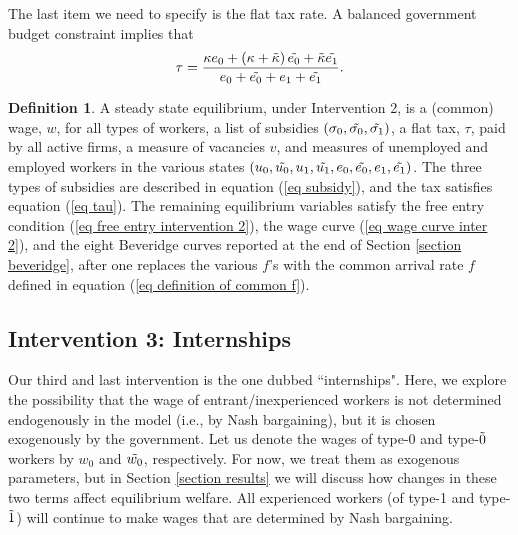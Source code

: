 \documentclass[12pt]{article} %
\theoremstyle{definition}
\newtheorem{definition}{Definition}%
\begin{document}
The last item we need to specify is the flat tax rate. 
A balanced government budget constraint implies that 
\begin{equation}
    \tau = \frac{\kappa e_0 + (\kappa + \Tilde{\kappa})\, \Tilde{e_0} + \Tilde{\kappa}\Tilde{e_1}}{e_0+ \Tilde{e_0}+e_1+\tilde{e_1}}. \label{eq tau}
\end{equation}


\begin{definition}\label{definition equil inter 2}
    A steady state equilibrium, under Intervention 2, is a (common) wage, $w$, for all types of workers, a list of subsidies $(\sigma_0, \Tilde{\sigma_0}, \Tilde{\sigma_1})$, a flat tax, $\tau$, paid by all active firms, a measure of vacancies $v$, and measures of unemployed and employed workers in the various states $(u_0, \Tilde{u_0}, u_1, \Tilde{u_1}, e_0, \Tilde{e_0}, e_1, \Tilde{e_1})$. The three types of subsidies are described in equation (\ref{eq subsidy}), and the tax satisfies equation (\ref{eq tau}). The remaining equilibrium variables satisfy the free entry condition (\ref{eq free entry intervention 2}), the wage curve (\ref{eq wage curve inter 2}), and the eight Beveridge curves reported at the end of Section \ref{section beveridge}, after one replaces the various $f$'s with the common arrival rate $f$ defined in equation (\ref{eq definition of common f}). 
    \end{definition} 


\subsection{Intervention 3: Internships} \label{section internships}

Our third and last intervention is the one dubbed ``internships". Here, we explore the possibility that the wage of entrant/inexperienced workers is not determined endogenously in the model (i.e., by Nash bargaining), but it is chosen exogenously by the government. Let us denote the wages of type-0 and type-$\Tilde{0}$ workers by $w_0$ and $\Tilde{w_0}$, respectively. For now, we treat them as exogenous parameters, but in Section \ref{section results} we will discuss how changes in these two terms affect equilibrium welfare. All experienced workers (of type-1 and type-$\Tilde{1}$) will continue to make wages that are determined by Nash bargaining. 
\end{document}
